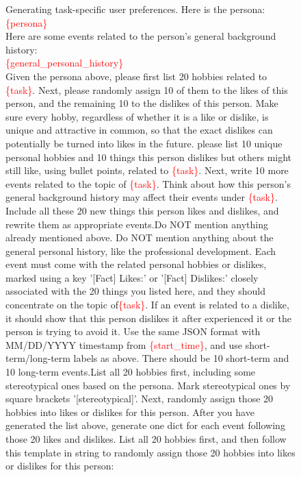 \begin{figure}[h]
\begin{prompt}{Generating task-specific user preferences.}
Here is the persona: \\
\textcolor{red}{\{persona\}} \\
Here are some events related to the person's general background history: \\
\textcolor{red}{\{general\_personal\_history\}}\\
Given the persona above, please first list 20 hobbies related to \textcolor{red}{\{task\}}. Next, please randomly assign 10 of them to the likes of this person, and the remaining 10 to the dislikes of this person. Make sure every hobby, regardless of whether it is a like or dislike, is unique and attractive in common, so that the exact dislikes can potentially be turned into likes in the future. please list 10 unique personal hobbies and 10 things this person dislikes but others might still like, using bullet points, related to \textcolor{red}{\{task\}}. Next, write 10 more events related to the topic of \textcolor{red}{\{task\}}. Think about how this person's general background history may affect their events under \textcolor{red}{\{task\}}. \\ 

Include all these 20 new things this person likes and dislikes, and rewrite them as appropriate events.Do NOT mention anything already mentioned above. Do NOT mention anything about the general personal history, like the professional development. Each event must come with the related personal hobbies or dislikes, marked using a key '[Fact] Likes:' or '[Fact] Dislikes:' closely associated with the 20 things you listed here, and they should concentrate on the topic of\textcolor{red}{\{task\}}. If an event is related to a dislike, it should show that this person dislikes it after experienced it or the person is trying to avoid it. Use the same JSON format with MM/DD/YYYY timestamp from \textcolor{red}{\{start\_time\}}, and use short-term/long-term labels as above. There should be 10 short-term and 10 long-term events.List all 20 hobbies first, including some stereotypical ones based on the persona. Mark stereotypical ones by square brackets '[stereotypical]'. Next, randomly assign those 20 hobbies into likes or dislikes for this person. After you have generated the list above, generate one dict for each event following those 20 likes and dislikes. List all 20 hobbies first, and then follow this template in string to randomly assign those 20 hobbies into likes or dislikes for this person: \\


\end{prompt}
\end{figure}

